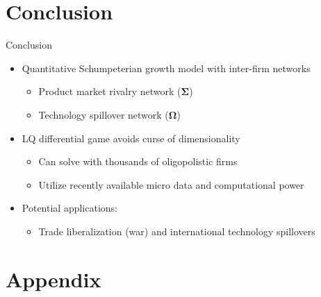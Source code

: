 \documentclass[
  10pt,               %
  aspectratio=169,     %
]{beamer}
\theoremstyle{plain}
\begin{document}
\section{Conclusion}
\begin{frame}{Conclusion}
  \begin{itemize}
    \item Quantitative Schumpeterian growth model with inter-firm networks
          \begin{itemize}
            \item Product market rivalry network ($\bm{\Sigma}$)
            \item Technology spillover network ($\bm{\Omega}$)
          \end{itemize}
          \medskip{}
    \item LQ differential game avoids curse of dimensionality
          \begin{itemize}
            \item Can solve with thousands of oligopolistic firms
            \item Utilize recently available micro data and computational power
          \end{itemize}
          \medskip{}
    \item Potential applications:
          \begin{itemize}
            \item Trade liberalization (war) and international technology spillovers
          \end{itemize}
  \end{itemize}
\end{frame}

\appendix

\section{Appendix}
\end{document}
